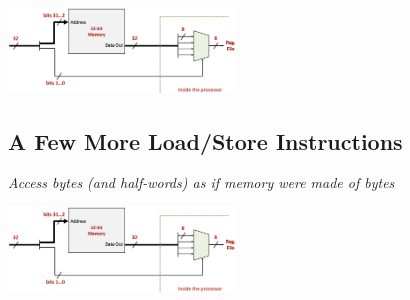 \begin{center}
    \includegraphics[width=0.45\textwidth]{chapters/chapter1c/images/lb.png}
\end{center}
\subsection{A Few More Load/Store Instructions}
\textit{Access bytes (and half-words) as if memory were made of bytes}
\begin{center}
    \includegraphics[width=0.45\textwidth]{chapters/chapter1c/images/lb.png}
\end{center}
